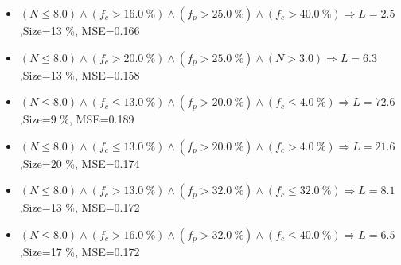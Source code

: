 \documentclass[numbered]{CSL}
\begin{document}
\begin{itemize}
\item $(N \leq 8.0) \land (f_c > 16.0~\%) \land (f_p > 25.0~\%) \land (f_c > 40.0~\%) \Rightarrow L = 2.5$,\hfill Size=13 \%, MSE=0.166
\item $(N \leq 8.0) \land (f_c > 20.0~\%) \land (f_p > 25.0~\%) \land (N > 3.0) \Rightarrow L = 6.3$,\hfill Size=13 \%, MSE=0.158
\item $(N \leq 8.0) \land (f_c \leq 13.0~\%) \land (f_p > 20.0~\%) \land (f_c \leq 4.0~\%) \Rightarrow L = 72.6$,\hfill Size=9 \%, MSE=0.189
\item $(N \leq 8.0) \land (f_c \leq 13.0~\%) \land (f_p > 20.0~\%) \land (f_c > 4.0~\%) \Rightarrow L = 21.6$,\hfill Size=20 \%, MSE=0.174
\item $(N \leq 8.0) \land (f_c > 13.0~\%) \land (f_p > 32.0~\%) \land (f_c \leq 32.0~\%) \Rightarrow L = 8.1$,\hfill Size=13 \%, MSE=0.172
\item $(N \leq 8.0) \land (f_c > 16.0~\%) \land (f_p > 32.0~\%) \land (f_c \leq 40.0~\%) \Rightarrow L = 6.5$,\hfill Size=17 \%, MSE=0.172
\end{itemize}
\end{document}
